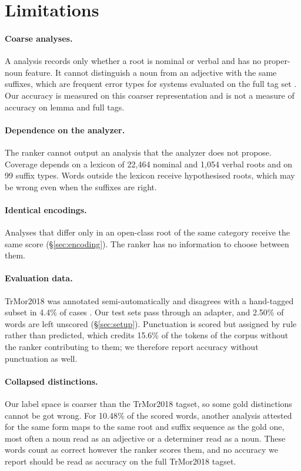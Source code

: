 \section*{Limitations}

\paragraph{Coarse analyses.}
A \savyar{} analysis records only whether a root is nominal or verbal and has no proper-noun feature. It cannot distinguish a noun from an adjective with the same suffixes, which are frequent error types for systems evaluated on the full tag set \citep{yildiz-etal-2016-morphology,ozer-korkmaz-2022-transmorph}. Our accuracy is measured on this coarser representation and is not a measure of accuracy on lemma and full tags.

\paragraph{Dependence on the analyzer.}
The ranker cannot output an analysis that the analyzer does not propose. Coverage depends on a lexicon of 22,464 nominal and 1,054 verbal roots and on 99 suffix types. Words outside the lexicon receive hypothesised roots, which may be wrong even when the suffixes are right.

\paragraph{Identical encodings.}
Analyses that differ only in an open-class root of the same category receive the same score (\S\ref{sec:encoding}). The ranker has no information to choose between them.

\paragraph{Evaluation data.}
TrMor2018 was annotated semi-automatically and disagrees with a hand-tagged subset in 4.4\% of cases \citep{akyurek-etal-2019-morphological}. Our test sets pass through an adapter, and 2.50\% of words are left unscored (\S\ref{sec:setup}). Punctuation is scored but assigned by rule rather than predicted, which credits 15.6\% of the tokens of the corpus without the ranker contributing to them; we therefore report accuracy without punctuation as well.

\paragraph{Collapsed distinctions.}
\label{sec:limitations-collapse}
Our label space is coarser than the TrMor2018 tagset, so some gold distinctions cannot be got wrong. For 10.48\% of the scored words, another analysis attested for the same form maps to the same root and suffix sequence as the gold one, most often a noun read as an adjective or a determiner read as a noun. These words count as correct however the ranker scores them, and no accuracy we report should be read as accuracy on the full TrMor2018 tagset.

